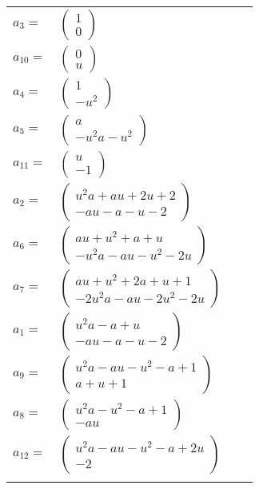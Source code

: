 \documentclass[1p]{elsarticle_modified}
\theoremstyle{definition}
\begin{document}
\begin{tabular}{m{7pt} m{180pt} m{7pt} m{180pt} }
\flushright $a_{3}=$&$\begin{pmatrix}1\\0\end{pmatrix}$ \\
\flushright $a_{10}=$&$\begin{pmatrix}0\\u\end{pmatrix}$ \\
\flushright $a_{4}=$&$\begin{pmatrix}1\\- u^2\end{pmatrix}$ \\
\flushright $a_{5}=$&$\begin{pmatrix}a\\- u^2 a- u^2\end{pmatrix}$ \\
\flushright $a_{11}=$&$\begin{pmatrix}u\\-1\end{pmatrix}$ \\
\flushright $a_{2}=$&$\begin{pmatrix}u^2 a+a u+2 u+2\\- a u- a- u-2\end{pmatrix}$ \\
\flushright $a_{6}=$&$\begin{pmatrix}a u+u^2+a+u\\- u^2 a- a u- u^2-2 u\end{pmatrix}$ \\
\flushright $a_{7}=$&$\begin{pmatrix}a u+u^2+2 a+u+1\\-2 u^2 a- a u-2 u^2-2 u\end{pmatrix}$ \\
\flushright $a_{1}=$&$\begin{pmatrix}u^2 a- a+u\\- a u- a- u-2\end{pmatrix}$ \\
\flushright $a_{9}=$&$\begin{pmatrix}u^2 a- a u- u^2- a+1\\a+u+1\end{pmatrix}$ \\
\flushright $a_{8}=$&$\begin{pmatrix}u^2 a- u^2- a+1\\- a u\end{pmatrix}$ \\
\flushright $a_{12}=$&$\begin{pmatrix}u^2 a- a u- u^2- a+2 u\\-2\end{pmatrix}$\\&\end{tabular}
\end{document}

